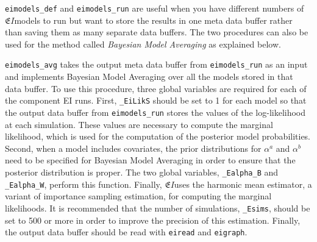 \documentclass[11pt,titlepage]{article}
\newcommand{\EI}{\ensuremath{{\mathfrak EI}}}
\begin{document}
\texttt{eimodels\_def} and \texttt{eimodels\_run} are useful when you
have different numbers of \EI models to run but want to store the
results in one meta data buffer rather than saving them as many
separate data buffers. The two procedures can also be used for the
method called \textit{Bayesian Model Averaging} as explained below.

\texttt{eimodels\_avg} takes the output meta data buffer from
\texttt{eimodels\_run} as an input and implements Bayesian Model
Averaging over all the models stored in that data buffer. To use this
procedure, three global variables are required for each of the
component EI runs.  First, \texttt{\_EiLikS} should be set to 1 for
each model so that the output data buffer from \texttt{eimodels\_run}
stores the values of the log-likelihood at each simulation. These
values are necessary to compute the marginal likelihood, which is used
for the computation of the posterior model probabilities. Second, when
a model includes covariates, the prior distributions for $\alpha^a$
and $\alpha^b$ need to be specified for Bayesian Model Averaging in
order to ensure that the posterior distribution is proper. The two
global variables, \texttt{\_Ealpha\_B} and \texttt{\_Ealpha\_W},
perform this function.  Finally, \EI uses the harmonic mean estimator,
a variant of importance sampling estimation, for computing the
marginal likelihoods. It is recommended that the number of
simulations, \texttt{\_Esims}, should be set to 500 or more in order
to improve the precision of this estimation.  Finally, the output data
buffer should be read with \texttt{eiread} and \texttt{eigraph}.
\end{document}
